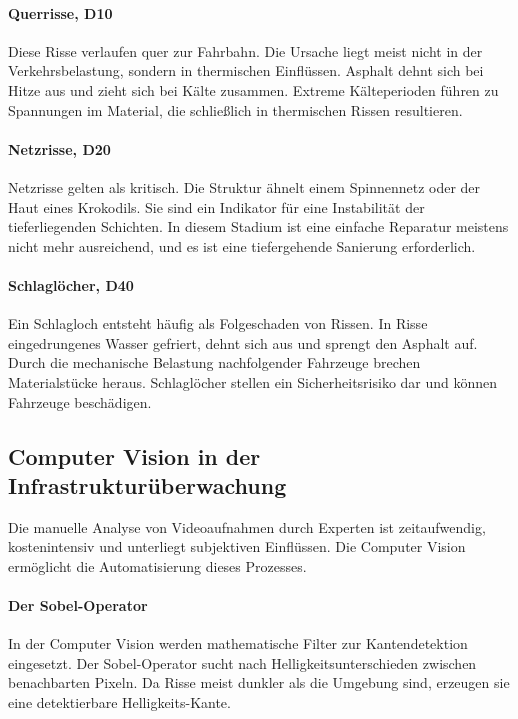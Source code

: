 \paragraph{Querrisse, D10}
Diese Risse verlaufen quer zur Fahrbahn. Die Ursache liegt meist nicht in der Verkehrsbelastung, sondern in thermischen Einflüssen. Asphalt dehnt sich bei Hitze aus und zieht sich bei Kälte zusammen. Extreme Kälteperioden führen zu Spannungen im Material, die schließlich in thermischen Rissen resultieren.

\paragraph{Netzrisse, D20}
Netzrisse gelten als kritisch. Die Struktur ähnelt einem Spinnennetz oder der Haut eines Krokodils. Sie sind ein Indikator für eine Instabilität der tieferliegenden Schichten. In diesem Stadium ist eine einfache Reparatur meistens nicht mehr ausreichend, und es ist eine tiefergehende Sanierung erforderlich.

\paragraph{Schlaglöcher, D40}
Ein Schlagloch entsteht häufig als Folgeschaden von Rissen. In Risse eingedrungenes Wasser gefriert, dehnt sich aus und sprengt den Asphalt auf. Durch die mechanische Belastung nachfolgender Fahrzeuge brechen Materialstücke heraus. Schlaglöcher stellen ein Sicherheitsrisiko dar und können Fahrzeuge beschädigen.

\subsection{Computer Vision in der Infrastrukturüberwachung}
\label{subsec:cv_infrastruktur}

Die manuelle Analyse von Videoaufnahmen durch Experten ist zeitaufwendig, kostenintensiv und unterliegt subjektiven Einflüssen. Die Computer Vision ermöglicht die Automatisierung dieses Prozesses.

\paragraph{Der Sobel-Operator}
In der Computer Vision werden mathematische Filter zur Kantendetektion eingesetzt. Der Sobel-Operator sucht nach Helligkeitsunterschieden zwischen benachbarten Pixeln. Da Risse meist dunkler als die Umgebung sind, erzeugen sie eine detektierbare Helligkeits-Kante.


